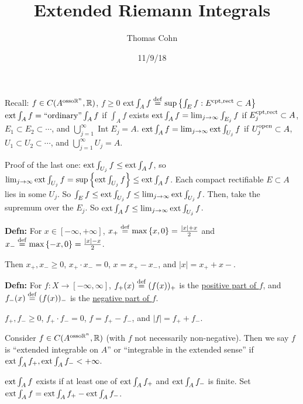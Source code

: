 \documentclass[10pt,letterpaper]{article}
\author{Thomas Cohn}
\title{Extended Riemann Integrals}
\date{11/9/18} %
\newcommand{\n}{\hfill\break}
\newcommand{\defn}[1]{\par\noindent\settowidth{\hangindent}{\textbf{Defn: }}\textbf{Defn: }#1\n}
\newcommand{\ptxt}[1]{\textrm{\textnormal{#1}}}
\newcommand{\set}[1]{\left\{#1\right\}}
\newcommand{\reals}{\mathbb{R}}
\newcommand{\R}{\reals}
\newcommand{\abs}[1]{\left|#1\right|}
\DeclareMathOperator{\Int}{Int}
\newcommand{\extint}{\ptxt{ext}\int}
\begin{document}
\maketitle
\setlength\RaggedRightParindent{\parindent}
\RaggedRight

\par\noindent Recall: $f\in{}C(A^{\ptxt{osso}\R^{n}},\R)$, $f\ge{}0$\n
$\extint_{A}f\overset{\ptxt{def}}{=}\sup\set{\int_{E}f:E^{\ptxt{cpt},\ptxt{rect}}\subset{}A}$\n
$\extint_{A}f=\ptxt{``ordinary''}\int_{A}f$ if $\int_{A}f$ exists\n
$\extint_{A}f=\lim_{j\to\infty}\int_{E_{j}}f$ if $E_{j}^{\ptxt{cpt},\ptxt{rect}}\subset{}A$, $E_{1}\subset{}E_{2}\subset\cdots$, and $\bigcup_{j=1}^{\infty}\Int{}E_{j}=A$.\n
$\extint_{A}f=\lim_{j\to\infty}\extint_{U_{j}}f$ if $U_{j}^{\ptxt{open}}\subset{}A$, $U_{1}\subset{}U_{2}\subset\cdots$, and $\bigcup_{j=1}^{\infty}U_{j}=A$.\n

\par\noindent Proof of the last one: $\extint_{U_{j}}f\le\extint_{A}f$, so $\lim_{j\to\infty}\extint_{U_{j}}f=\sup\set{\extint_{U_{j}}f}\le\extint_{A}f$.\n
Each compact rectifiable $E\subset{}A$ lies in some $U_{j}$. So $\int_{E}f\le\extint_{U_{j}}f\le\lim_{j\to\infty}\extint_{U_{j}}f$.\n
Then, take the supremum over the $E_{j}$. So $\extint_{A}f\le\lim_{j\to\infty}\extint_{U_{j}}f$.\n

\defn{For $x\in[-\infty,+\infty]$, $x_{+}\overset{\ptxt{def}}{=}\max\set{x,0}=\frac{\abs{x}+x}{2}$ and $x_{-}\overset{\ptxt{def}}{=}\max{\set{-x,0}}=\frac{\abs{x}-x}{2}$.}

\par\noindent Then $x_{+},x_{-}\ge{}0$, $x_{+}\cdot{}x_{-}=0$, $x=x_{+}-x_{-}$, and $\abs{x}=x_{+}+x{-}$.\n

\defn{For $f:X\to[-\infty,\infty]$, $f_{+}(x)\overset{\ptxt{def}}{=}(f(x))_{+}$ is the \underline{positive part of $f$}, and $f_{-}(x)\overset{\ptxt{def}}{=}(f(x))_{-}$ is the \underline{negative part of $f$}.}

\par\noindent $f_{+},f_{-}\ge{}0$, $f_{+}\cdot{}f_{-}=0$, $f=f_{+}-f_{-}$, and $\abs{f}=f_{+}+f_{-}$.\n

\par\noindent Consider $f\in{}C(A^{\ptxt{osso}\R^{n}},\R)$ (with $f$ not necessarily non-negative). Then we say $f$ is ``extended integrable on $A$'' or ``integrable in the extended sense'' if $\extint_{A}f_{+},\extint_{A}f_{-}<+\infty$.\n

\par\noindent $\extint_{A}f$ exists if at least one of $\extint_{A}f_{+}$ and $\extint_{A}f_{-}$ is finite. Set $\extint_{A}f=\extint_{A}f_{+}-\extint_{A}f_{-}$.\n
\end{document}
